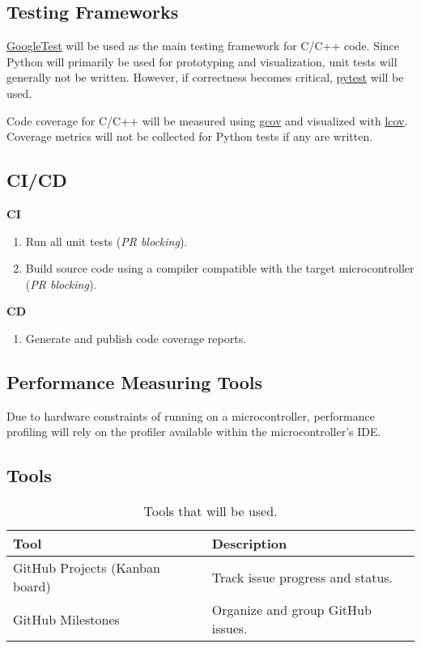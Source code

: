 \documentclass{article}
\begin{document}
\subsection{Testing Frameworks}
\href{https://github.com/google/googletest}{GoogleTest} will be used as the main testing framework for C/C++ code.
Since Python will primarily be used for prototyping and visualization, unit tests will generally not be written. However, if correctness becomes critical, \href{https://docs.pytest.org/}{pytest} will be used.

Code coverage for C/C++ will be measured using \href{https://gcc.gnu.org/onlinedocs/gcc/Gcov.html}{gcov} and visualized with \href{https://wiki.documentfoundation.org/Development/Lcov}{lcov}.
Coverage metrics will not be collected for Python tests if any are written.

\subsection{CI/CD}

\textbf{CI}
\begin{enumerate}
  \item Run all unit tests (\textit{PR blocking}).
  \item Build source code using a compiler compatible with the target microcontroller (\textit{PR blocking}).
\end{enumerate}
\textbf{CD} %
\begin{enumerate}
    \item Generate and publish code coverage reports.
\end{enumerate}

\subsection{Performance Measuring Tools}
Due to hardware constraints of running on a microcontroller, performance profiling will rely on the profiler available within the microcontroller’s IDE.

\subsection{Tools}
\begin{table}[h!]
\centering
\begin{tabularx}{\textwidth}{|l|X|}
\hline
\textbf{Tool} & \textbf{Description} \\ \hline
GitHub Projects (Kanban board) & Track issue progress and status. \\ \hline
GitHub Milestones & Organize and group GitHub issues. \\ \hline
\end{tabularx}
\caption{Tools that will be used.}
\end{table}
\end{document}
